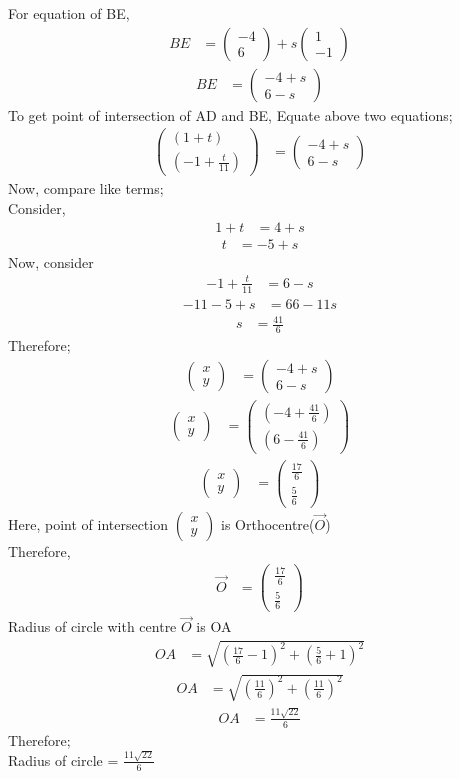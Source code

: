 \documentclass[journal,12pt,onecolumn]{IEEEtran}
\newcommand{\myvec}[1]{\ensuremath{\begin{pmatrix}#1\end{pmatrix}}}
\begin{document}
For equation of BE,
\begin{align}
       BE &= \myvec{-4\\6} + s\myvec{1\\-1}
\end{align}
\begin{align}
       BE &= \myvec{-4+s\\6-s}
\end{align}
To get point of intersection of AD and BE, Equate above two equations;
\begin{align}
       \myvec{\left(1+t\right)\\\left(-1+\frac{t}{11}\right)} &= \myvec{-4+s\\6-s}
\end{align}
Now, compare like terms;\\
Consider,
\begin{align}
       1+t &= 4+s
\end{align}
\begin{align}
       t &= -5+s
\end{align}
Now, consider
\begin{align}
       -1+\frac{t}{11} &= 6-s
\end{align}
\begin{align}
       -11-5+s &= 66-11s
\end{align}
\begin{align}
        s &= \frac{41}{6}
\end{align}
Therefore;
\begin{align}
        \myvec{x\\y} &= \myvec{-4+s\\6-s}
\end{align}
\begin{align}
        \myvec{x\\y} &= \myvec{\left(-4+\frac{41}{6}\right)\\\left(6-\frac{41}{6}\right)}
\end{align}
\begin{align}
        \myvec{x\\y} &= \myvec{\frac{17}{6}\\\frac{5}{6}}
\end{align}
Here, point of intersection \myvec{x\\y} is Orthocentre($\vec{O}$)\\
Therefore,\\
\begin{align}
        \vec{O} &= \myvec{\frac{17}{6}\\\frac{5}{6}}
\end{align}
Radius of circle with centre $\vec{O}$ is OA
\begin{align}
             OA &= \sqrt{\left(\frac{17}{6} - 1 \right)^2 + \left(\frac{5}{6} + 1 \right)^2}
\end{align}
\begin{align}
             OA &= \sqrt{(\frac{11}{6})^2 + (\frac{11}{6})^2}
\end{align}
\begin{align}
             OA &= \frac{11\sqrt{22}}{6}
\end{align}
Therefore;\\
Radius of circle = $\frac{11\sqrt{22}}{6}$\\
\end{document}
